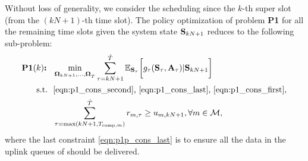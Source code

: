 Without loss of generality, we consider the scheduling since the $k$-th super slot (from the $(kN+1)$-th time slot). The policy optimization of problem {\bf P1} for all the remaining time slots given the system state $\mathbf{S}_{kN+1}$ reduces to the following sub-problem:
\begin{align}
    \textbf{P1$(k)$:~~} &
    \min_{ \boldsymbol{\Omega}_{kN+1}, \dots, \boldsymbol{\Omega}_{\hat{T}} }
        \sum_{\tau=kN+1}^{{\hat{T}}}  \mathbb{E}_{\mathbf{S}_{\tau}} \bigg[
            g_{\tau}( \mathbf{S}_{\tau}, \mathbf{A}_{\tau} ) | \mathbf{S}_{kN+1}
        \bigg] \nonumber
    \\ \nonumber
    \text{s.t.~~} &\text{\eqref{eqn:p1_cons_second}, \eqref{eqn:p1_cons_last}, \eqref{eqn:p1_cons_first}},
    \\
    & \sum_{ \tau=\max(kN+1,T_{\text{comp},m}) }^{ {\hat{T}} } r_{m,\tau} \geq {u}_{m,kN+1}, \forall m\in\mathcal{M},
    \label{eqn:p1p_cons_last}
\end{align}
where the last constraint \eqref{eqn:p1p_cons_last} is to ensure all the data in the uplink queues of {\IAVs} should be delivered.


